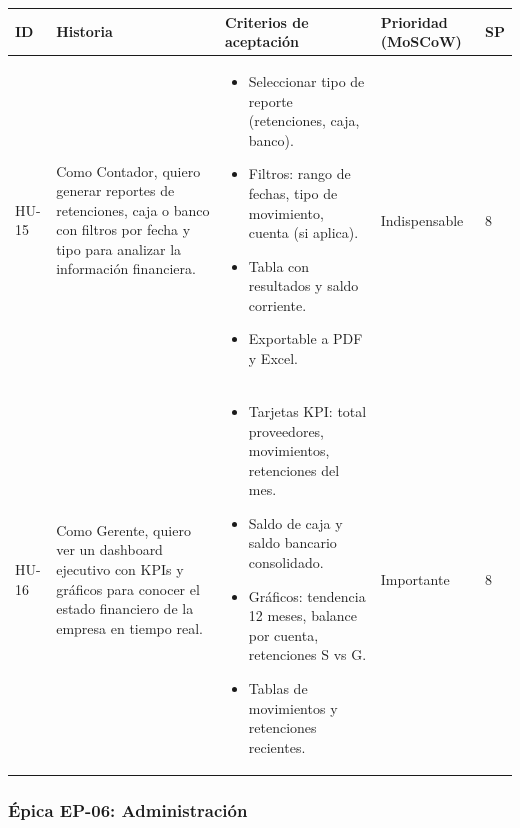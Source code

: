 \documentclass[stu]{apa7}
\begin{document}
\begin{longtable}{|L{0.8cm}|L{4.5cm}|L{3.5cm}|L{2cm}|L{1.5cm}|}
\hline
{}
\textbf{ID} & \textbf{Historia} & \textbf{Criterios de aceptación} & \textbf{Prioridad (MoSCoW)} & \textbf{SP} \\
\hline
\endhead
HU-15 & Como Contador, quiero generar reportes de retenciones, caja o banco con filtros por fecha y tipo para analizar la información financiera. & 
\begin{itemize}[nosep]
    \item Seleccionar tipo de reporte (retenciones, caja, banco).
    \item Filtros: rango de fechas, tipo de movimiento, cuenta (si aplica).
    \item Tabla con resultados y saldo corriente.
    \item Exportable a PDF y Excel.
\end{itemize} & Indispensable & 8 \\
\hline
HU-16 & Como Gerente, quiero ver un dashboard ejecutivo con KPIs y gráficos para conocer el estado financiero de la empresa en tiempo real. & 
\begin{itemize}[nosep]
    \item Tarjetas KPI: total proveedores, movimientos, retenciones del mes.
    \item Saldo de caja y saldo bancario consolidado.
    \item Gráficos: tendencia 12 meses, balance por cuenta, retenciones S vs G.
    \item Tablas de movimientos y retenciones recientes.
\end{itemize} & Importante & 8 \\
\hline
\end{longtable}

\subsubsection{Épica EP-06: Administración}
\end{document}
